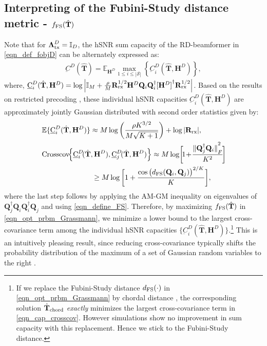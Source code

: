 \documentclass[journal,comsoc]{IEEEtran}
\begin{document}
\subsection{Interpreting of the Fubini-Study distance metric - $f_{\rm FS}(\hat{\mathbf{T}})$}
Note that for $\boldsymbol{\Lambda}^D_{\rm tx} = \mathbb{I}_D$, the hSNR sum capacity of the RD-beamformer in \eqref{eqn_def_fobjD} can be alternately expressed as: 
\begin{eqnarray}
\underbar{C}^{D}(\hat{\mathbf{T}}) = \mathbb{E}_{\mathbf{H}^{D}} \max_{1\leq i \leq |\mathcal{S}|} \left\{ \underbar{C}^{D}_{i}(\hat{\mathbf{T}}, \mathbf{H}^{D}) \right\},
\end{eqnarray}
where, $\underbar{C}^{D}_{i}(\hat{\mathbf{T}}, \mathbf{H}^D) = \log \left| \mathbb{I}_M + \frac{\rho}{M} \mathbf{R}_{\rm rx}^{1/2} \mathbf{H}^{D} \mathbf{Q}_i  \mathbf{Q}_i^{\dag} {[\mathbf{H}^D]}^{\dag} \mathbf{R}_{\rm rx}^{1/2} \right|$. Based on the results on restricted precoding \cite{Vishnu_jrnl1}, these individual hSNR capacities $\underbar{C}^{D}_{i}(\hat{\mathbf{T}}, \mathbf{H}^{D})$ are approximately jointly Gaussian distributed with second order statistics given by:
\begingroup\makeatletter\def\f@size{9.7}\check@mathfonts
\begin{subequations}
\begin{flalign}
&\mathbb{E}\{ \underbar{C}^{D}_{i}(\hat{\mathbf{T}}, \mathbf{H}^D) \} \approx M\log \left( \frac{\rho K^{3/2}}{M \sqrt{K+1}}\right) + \log|\mathbf{R}_{\rm rx}|, \label{eqn_cap_mean} & \\
& \text{Crosscov}\!\! \left\{ \underbar{C}^{D}_{i}\!(\hat{\mathbf{T}}, \mathbf{H}^D), \underbar{C}^{D}_{j}\!(\hat{\mathbf{T}}, \mathbf{H}^D) \right\} \approx M \log \!\bigg[ \! 1 \!+\! \frac{{\|\mathbf{Q}_j^{\dag} \mathbf{Q}_i\|}^2_F}{K^2} \!\bigg] \!\!\!\!\!\!\! \label{eqn_cap_crosscov} & \\
& \qquad \qquad \qquad \quad \geq M \log \bigg[1 + \frac{{\cos \big(d_{\rm FS}(\mathbf{Q}_i, \mathbf{Q}_j)\big)}^{2/K}}{K}\bigg], \nonumber &
\end{flalign}
\end{subequations}
\endgroup
where the last step follows by applying the AM-GM inequality on eigenvalues of $\mathbf{Q}_j^{\dag} \mathbf{Q}_i \mathbf{Q}_i^{\dag} \mathbf{Q}_j$ and using \eqref{eqn_define_FS}. Therefore, by maximizing $f_{\rm FS}(\hat{\mathbf{T}})$ in \eqref{eqn_opt_prbm_Grassmann}, we minimize a lower bound to the largest cross-covariance term among the individual hSNR capacities $\{\underbar{C}^{D}_{i}(\hat{\mathbf{T}}, \mathbf{H}^D)\}$.\footnote{
If we replace the Fubini-Study distance $d_{\rm FS}(\cdot)$ in \eqref{eqn_opt_prbm_Grassmann} by chordal distance \cite{Love_SMux}, the corresponding solution $\hat{\mathbf{T}}_{\rm chord}$ \emph{exactly} minimizes the largest cross-covariance term in \eqref{eqn_cap_crosscov}.
However simulations show no improvement in sum capacity with this replacement. Hence we stick to the Fubini-Study distance.} 
This is an intuitively pleasing result, since reducing cross-covariance typically shifts the probability distribution of the maximum of a set of Gaussian random variables to the right \cite{Vitale}.
\end{document}
